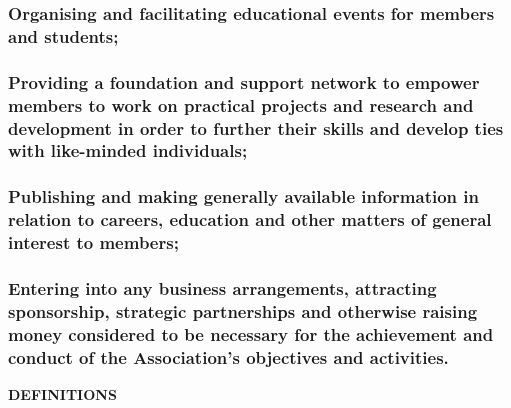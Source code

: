 \documentclass{article}
\newenvironment{subs}
  {\adjustwidth{2em}{0pt}}
  {\endadjustwidth}
\begin{document}
\begin{subs}
\begin{subs}
\subsubsection{Organising and facilitating educational events for members and students;}
\subsubsection{Providing a foundation and support network to empower members to work on practical projects and research and development in order to further their skills and develop ties with like-minded individuals;}
\subsubsection{Publishing and making generally available information in relation to careers, education and other matters of general interest to members;}
\subsubsection{Entering into any business arrangements, attracting sponsorship, strategic partnerships and otherwise raising money considered to be necessary for the achievement and conduct of the Association's objectives and activities.}
\end{subs}
\end{subs}

\vspace{5mm}
{\large\bf DEFINITIONS\par}
\hrulefill
\vspace{5mm}
\end{document}
